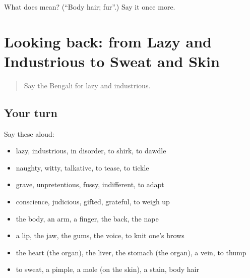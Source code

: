 \begin{tcolorbox}[breakable,colback=teal!4,colframe=teal!35!black,title={Before you move on}]
What does  mean? (\textquotedblleft{}Body hair; fur\textquotedblright{}.) Say it once more.
\end{tcolorbox}
\section[(dialogue)]{Looking back: from Lazy and Industrious to Sweat and Skin}

\label{lesson:BN-R469-review-462-469}



\begin{quote}
Say the Bengali for lazy and industrious.
\end{quote}

\subsection*{Your turn}
Say these aloud:

\begin{itemize}
\raggedright
  \item lazy, industrious, in disorder, to shirk, to dawdle
  \item naughty, witty, talkative, to tease, to tickle
  \item grave, unpretentious, fussy, indifferent, to adapt
  \item conscience, judicious, gifted, grateful, to weigh up
  \item the body, an arm, a finger, the back, the nape
  \item a lip, the jaw, the gums, the voice, to knit one's brows
  \item the heart (the organ), the liver, the stomach (the organ), a vein, to thump
  \item to sweat, a pimple, a mole (on the skin), a stain, body hair
\end{itemize}

